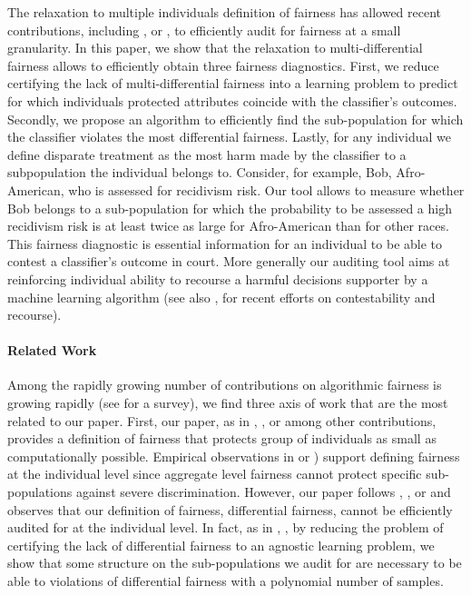 \documentclass{article}
\begin{document}
 \bigskip
 The relaxation to multiple individuals definition of fairness has allowed recent contributions, including \cite{kim2018fairness}, \cite{hebert2017calibration} or \cite{kearns2017preventing}, to efficiently audit for fairness at a small granularity. In this paper,  we show that the relaxation to multi-differential fairness allows to efficiently obtain three fairness diagnostics.  First, we reduce certifying the lack of multi-differential fairness into a learning problem to predict for which individuals protected attributes coincide with the classifier's outcomes. Secondly, we propose an algorithm to efficiently find the sub-population for which the classifier violates the most differential fairness. Lastly, for any individual we define disparate treatment as the most harm made by the classifier to a subpopulation the individual belongs to. Consider, for example, Bob, Afro-American, who is assessed for recidivism risk. Our tool allows to measure whether Bob belongs to a sub-population for which the probability to be assessed a high recidivism risk is at least twice as large for Afro-American than for other races. This fairness diagnostic is essential information for an individual to be able to contest a classifier's outcome in court. More generally our auditing tool aims at reinforcing individual ability to recourse a harmful decisions supporter by a machine learning algorithm (see also \cite{ustun2018actionable}, \cite{russell2019efficient} for recent efforts on contestability and recourse).  
 
 \paragraph{Related Work}
 Among the rapidly growing number of contributions on algorithmic fairness is growing rapidly (see  \cite{chouldechova2018frontiers} for a survey), we find three axis of work that are the most related to our paper. First, our paper, as in  \cite{hebert2017calibration}, \cite{kim2018fairness}, or \cite{kearns2017preventing} among other contributions, provides a definition of fairness that protects group of individuals as small as computationally possible. Empirical observations in \cite{kearns2017preventing} or \cite{dwork2012fairness}) support defining fairness at the individual level since aggregate level fairness cannot protect specific sub-populations against severe discrimination. However, our paper follows  \cite{hebert2017calibration}, \cite{kim2018fairness}, or \cite{kearns2017preventing} and observes that our definition of fairness, differential fairness, cannot be efficiently audited for at the individual level. In fact, as in \cite{hebert2017calibration}, \cite{kim2018fairness}, by reducing the problem of certifying the lack of differential fairness to an agnostic learning problem, we show that some structure on the sub-populations we audit for are necessary to be able to violations of differential fairness with a polynomial number of samples. 
 
\end{document}
